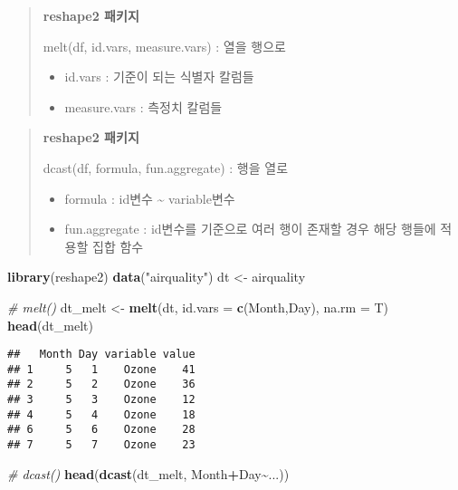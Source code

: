 \documentclass[
]{article}
\newenvironment{Shaded}{\begin{snugshade}}{\end{snugshade}}
\newcommand{\AttributeTok}[1]{\textcolor[rgb]{0.13,0.29,0.53}{#1}}
\newcommand{\CommentTok}[1]{\textcolor[rgb]{0.56,0.35,0.01}{\textit{#1}}}
\newcommand{\FunctionTok}[1]{\textcolor[rgb]{0.13,0.29,0.53}{\textbf{#1}}}
\newcommand{\NormalTok}[1]{#1}
\newcommand{\OtherTok}[1]{\textcolor[rgb]{0.56,0.35,0.01}{#1}}
\newcommand{\SpecialCharTok}[1]{\textcolor[rgb]{0.81,0.36,0.00}{\textbf{#1}}}
\newcommand{\StringTok}[1]{\textcolor[rgb]{0.31,0.60,0.02}{#1}}
\begin{document}
\begin{quote}
\textbf{reshape2 패키지}

melt(df, id.vars, measure.vars) : 열을 행으로

\begin{itemize}
\item
  id.vars : 기준이 되는 식별자 칼럼들
\item
  measure.vars : 측정치 칼럼들
\end{itemize}
\end{quote}

\begin{quote}
\textbf{reshape2 패키지}

dcast(df, formula, fun.aggregate) : 행을 열로

\begin{itemize}
\item
  formula : id변수 \textasciitilde{} variable변수
\item
  fun.aggregate : id변수를 기준으로 여러 행이 존재할 경우 해당 행들에
  적용할 집합 함수
\end{itemize}
\end{quote}

\begin{Shaded}
\begin{Highlighting}[]
\FunctionTok{library}\NormalTok{(reshape2)}
\FunctionTok{data}\NormalTok{(}\StringTok{"airquality"}\NormalTok{)}
\NormalTok{dt }\OtherTok{\textless{}{-}}\NormalTok{ airquality}

\CommentTok{\# melt()}
\NormalTok{dt\_melt }\OtherTok{\textless{}{-}} \FunctionTok{melt}\NormalTok{(dt, }\AttributeTok{id.vars =} \FunctionTok{c}\NormalTok{(}\StringTok{\textquotesingle{}Month\textquotesingle{}}\NormalTok{,}\StringTok{\textquotesingle{}Day\textquotesingle{}}\NormalTok{), }\AttributeTok{na.rm =}\NormalTok{ T)}
\FunctionTok{head}\NormalTok{(dt\_melt)}
\end{Highlighting}
\end{Shaded}

\begin{verbatim}
##   Month Day variable value
## 1     5   1    Ozone    41
## 2     5   2    Ozone    36
## 3     5   3    Ozone    12
## 4     5   4    Ozone    18
## 6     5   6    Ozone    28
## 7     5   7    Ozone    23
\end{verbatim}

\begin{Shaded}
\begin{Highlighting}[]
\CommentTok{\# dcast()}
\FunctionTok{head}\NormalTok{(}\FunctionTok{dcast}\NormalTok{(dt\_melt, Month}\SpecialCharTok{+}\NormalTok{Day}\SpecialCharTok{\textasciitilde{}}\NormalTok{...))}
\end{Highlighting}
\end{Shaded}
\end{document}
